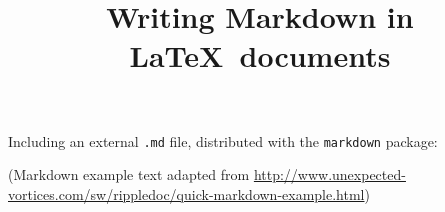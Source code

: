 \documentclass{article}
\title{Writing Markdown in \LaTeX\ documents}
\author{}
\date{}
\begin{document}
\maketitle

Including an external \texttt{.md} file, distributed with the \texttt{markdown} package:



(Markdown example text adapted from \url{http://www.unexpected-vortices.com/sw/rippledoc/quick-markdown-example.html})





















\end{document}

